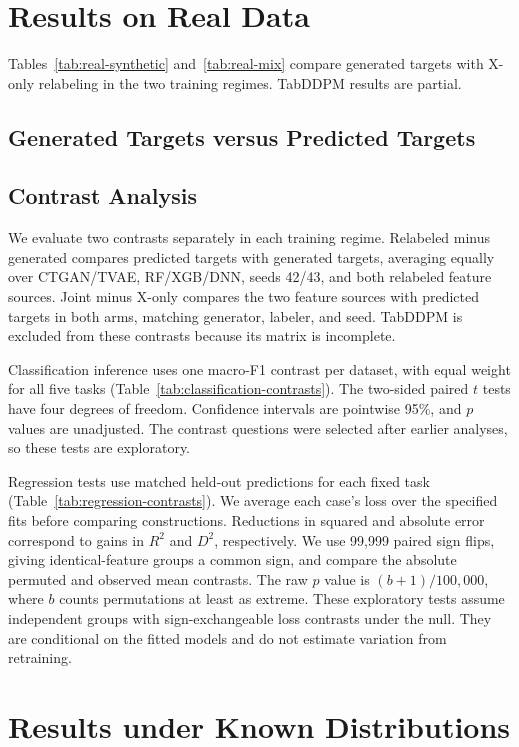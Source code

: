 \documentclass[letterpaper]{article}
\begin{document}
\FloatBarrier
\section{Results on Real Data}
Tables~\ref{tab:real-synthetic} and~\ref{tab:real-mix} compare generated
targets with X-only relabeling in the two training regimes. TabDDPM
results are partial.
\subsection{Generated Targets versus Predicted Targets}


\subsection{Contrast Analysis}
We evaluate two contrasts separately in each training regime. Relabeled
minus generated compares predicted targets with generated targets,
averaging equally over CTGAN/TVAE, RF/XGB/DNN, seeds 42/43, and both
relabeled feature sources. Joint minus X-only compares the two feature
sources with predicted targets in both arms, matching generator, labeler,
and seed. TabDDPM is excluded from these contrasts because its matrix
is incomplete.

Classification inference uses one macro-F1 contrast per dataset, with
equal weight for all five tasks (Table~\ref{tab:classification-contrasts}).
The two-sided paired $t$ tests have four degrees of freedom. Confidence
intervals are pointwise 95\%, and $p$ values are unadjusted. The contrast
questions were selected after earlier analyses, so these tests are
exploratory.

Regression tests use matched held-out predictions for each fixed task
(Table~\ref{tab:regression-contrasts}). We average each case's loss over
the specified fits before comparing constructions. Reductions in squared
and absolute error correspond to gains in $R^2$ and $D^2$, respectively.
We use 99,999 paired sign flips, giving identical-feature groups a common
sign, and compare the absolute permuted and observed mean contrasts.
The raw $p$ value is $(b+1)/100{,}000$, where $b$ counts permutations at
least as extreme. These exploratory tests assume independent groups with
sign-exchangeable loss contrasts under the null. They are conditional on
the fitted models and do not estimate variation from retraining.



\section{Results under Known Distributions}

\end{document}
